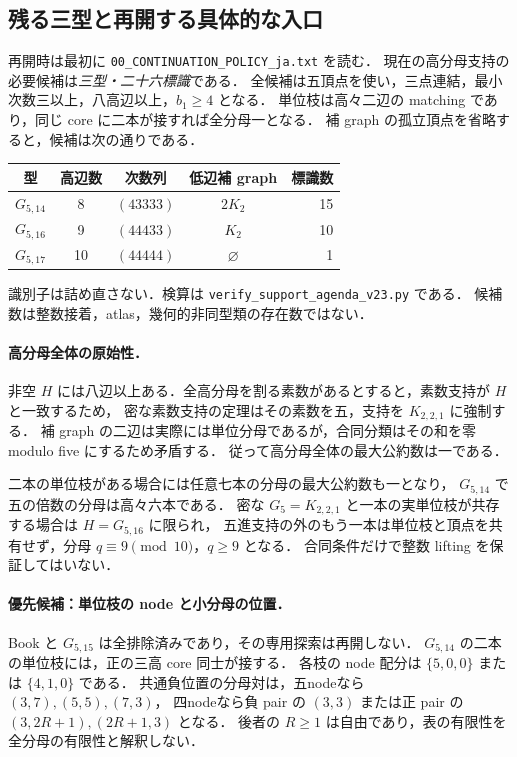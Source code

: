 \subsection{残る三型と再開する具体的な入口}
\label{ns24:support-agenda}\label{ns23:support-agenda}\label{ns22:support-agenda}\label{ns20:support-agenda}

再開時は最初に \nolinkurl{00_CONTINUATION_POLICY_ja.txt} を読む．
現在の高分母支持の必要候補は\emph{三型・二十六標識}である．
全候補は五頂点を使い，三点連結，最小次数三以上，八高辺以上，$b_1\ge4$ となる．
単位枝は高々二辺の matching であり，同じ core に二本が接すれば全分母一となる．
補 graph の孤立頂点を省略すると，候補は次の通りである．
\begin{center}\small
\begin{tabular}{c|c|c|c|r}
型&高辺数&次数列&低辺補 graph&標識数\\\hline
$G_{5,14}$&8&$(43333)$&$2K_2$&15\\
$G_{5,16}$&9&$(44433)$&$K_2$&10\\
$G_{5,17}$&10&$(44444)$&$\varnothing$&1
\end{tabular}
\end{center}
識別子は詰め直さない．検算は \nolinkurl{verify_support_agenda_v23.py} である．
候補数は整数接着，atlas，幾何的非同型類の存在数ではない．

\paragraph{高分母全体の原始性．}
非空 $H$ には八辺以上ある．全高分母を割る素数があるとすると，素数支持が $H$ と一致するため，
密な素数支持の定理はその素数を五，支持を $K_{2,2,1}$ に強制する．
補 graph の二辺は実際には単位分母であるが，合同分類はその和を零 modulo five にするため矛盾する．
従って高分母全体の最大公約数は一である．

二本の単位枝がある場合には任意七本の分母の最大公約数も一となり，
$G_{5,14}$ で五の倍数の分母は高々六本である．
密な $G_5=K_{2,2,1}$ と一本の実単位枝が共存する場合は $H=G_{5,16}$ に限られ，
五進支持の外のもう一本は単位枝と頂点を共有せず，分母 $q\equiv9\pmod{10}$，$q\ge9$ となる．
合同条件だけで整数 lifting を保証してはいない．

\paragraph{優先候補：単位枝の node と小分母の位置．}
Book と $G_{5,15}$ は全排除済みであり，その専用探索は再開しない．
$G_{5,14}$ の二本の単位枝には，正の三高 core 同士が接する．
各枝の node 配分は $\{5,0,0\}$ または $\{4,1,0\}$ である．
共通負位置の分母対は，五nodeなら $(3,7),(5,5),(7,3)$，
四nodeなら負 pair の $(3,3)$ または正 pair の $(3,2R+1),(2R+1,3)$ となる．
後者の $R\ge1$ は自由であり，表の有限性を全分母の有限性と解釈しない．

